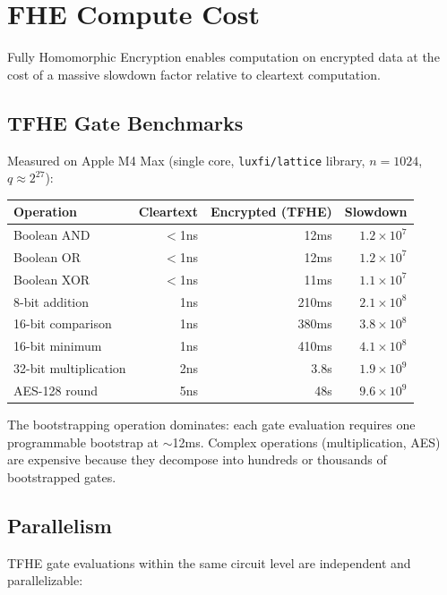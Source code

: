 \section{FHE Compute Cost}


Fully Homomorphic Encryption enables computation on encrypted data at the cost of a massive slowdown factor relative to cleartext computation.

\subsection{TFHE Gate Benchmarks}

Measured on Apple M4 Max (single core, \texttt{luxfi/lattice} library, $n=1024$, $q \approx 2^{27}$):

\begin{center}
\begin{tabular}{lrrr}
\toprule
\textbf{Operation} & \textbf{Cleartext} & \textbf{Encrypted (TFHE)} & \textbf{Slowdown} \\
\midrule
Boolean AND & $<$1ns & 12ms & $1.2 \times 10^7$ \\
Boolean OR & $<$1ns & 12ms & $1.2 \times 10^7$ \\
Boolean XOR & $<$1ns & 11ms & $1.1 \times 10^7$ \\
8-bit addition & 1ns & 210ms & $2.1 \times 10^8$ \\
16-bit comparison & 1ns & 380ms & $3.8 \times 10^8$ \\
16-bit minimum & 1ns & 410ms & $4.1 \times 10^8$ \\
32-bit multiplication & 2ns & 3.8s & $1.9 \times 10^9$ \\
AES-128 round & 5ns & 48s & $9.6 \times 10^9$ \\
\bottomrule
\end{tabular}
\end{center}

\begin{observation}
The bootstrapping operation dominates: each gate evaluation requires one programmable bootstrap at $\sim$12ms. Complex operations (multiplication, AES) are expensive because they decompose into hundreds or thousands of bootstrapped gates.
\end{observation}

\subsection{Parallelism}

TFHE gate evaluations within the same circuit level are independent and parallelizable:

